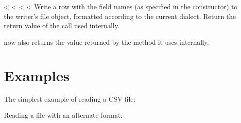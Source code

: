 \documentclass[letterpaper,10pt,english]{sphinxmanual}
\begin{document}
\begin{fulllineitems}
\label{\detokenize{csv:csv.DictWriter.writeheader}}
<%
\pysigstartsignatures
<%
<%
<%
Write a row with the field names (as specified in the constructor) to
the writer’s file object, formatted according to the current dialect. Return
the return value of the {\hyperref[\detokenize{csv:csv.csvwriter.writerow}]{}} call used internally.


 now also returns the value returned by
the {\hyperref[\detokenize{csv:csv.csvwriter.writerow}]{}} method it uses internally.

\end{fulllineitems}



\section{Examples}
\label{\detokenize{csv:examples}}\label{\detokenize{csv:csv-examples}}
The simplest example of reading a CSV file:

\begin{sphinxVerbatim}[commandchars=\\\{\}]
 
    
      
       
\end{sphinxVerbatim}

Reading a file with an alternate format:
\end{document}
